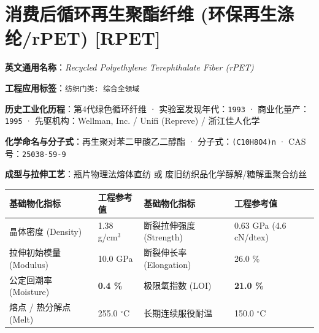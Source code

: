 \documentclass[11pt,openright,twoside,UTF8]{ctexbook}
\begin{document}
\section{消费后循环再生聚酯纤维 (环保再生涤纶/rPET) [RPET]}
\label{sec:rpet}

\noindent\textbf{英文通用名称}：\textit{Recycled Polyethylene Terephthalate Fiber (rPET)}\par
\noindent\textbf{工程应用标签}：\texttt{纺织门类: 综合全领域}\par
\noindent\textbf{历史工业化历程}：第4代绿色循环纤维 · 实验室发现年代：\texttt{1993} · 商业化量产：\texttt{1995} · 先驱机构：Wellman, Inc. / Unifi (Repreve) / 浙江佳人化学\par
\noindent\textbf{化学命名与分子式}：再生聚对苯二甲酸乙二醇酯 · 分子式：\texttt{(C10H8O4)n} · CAS 号：\texttt{25038-59-9}\par
\noindent\textbf{成型与拉伸工艺}：瓶片物理法熔体直纺 或 废旧纺织品化学醇解/糖解重聚合纺丝\par

\vspace{0.15cm}
\begin{center}
\small
\begin{tabularx}{\textwidth}{p{3.8cm}Xp{3.8cm}X}
\toprule
\textbf{基础物化指标} & \textbf{工程参考值} & \textbf{基础物化指标} & \textbf{工程参考值} \\
\midrule
晶体密度 (Density) & 1.38 g/cm$^3$ & 断裂拉伸强度 (Strength) & 0.63 GPa (4.6 cN/dtex) \\
拉伸初始模量 (Modulus) & 10.0 GPa & 断裂伸长率 (Elongation) & 26.0 \% \\
公定回潮率 (Moisture) & \textbf{0.4 \%} & 极限氧指数 (LOI) & \textbf{21.0 \%} \\
熔点 / 热分解点 (Melt) & 255.0 $^\circ\mathrm{C}$ & 长期连续服役耐温 & 150.0 $^\circ\mathrm{C}$ \\
\bottomrule
\end{tabularx}
\end{center}
\vspace{0.15cm}
\end{document}
